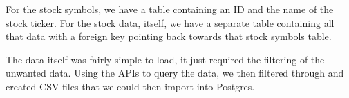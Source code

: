 \documentclass{article}
\begin{document}
    For the stock symbols, we have a table containing an ID and the name of the stock ticker. For
    the stock data, itself, we have a separate table containing all that data with a foreign key
    pointing back towards that stock symbols table.

    The data itself was fairly simple to load, it just required the filtering of the unwanted
    data. Using the APIs to query the data, we then filtered through and created CSV files that
    we could then import into Postgres.
\end{document}
